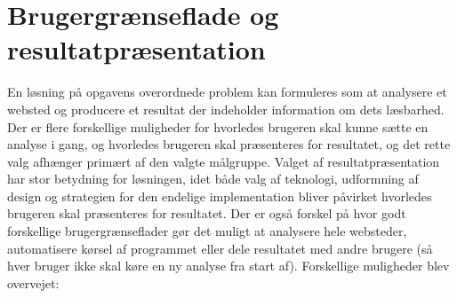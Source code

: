 \documentclass[a4paper,oneside]{memoir}
\begin{document}
\section{Brugergrænseflade og resultatpræsentation}
\label{brugergraenseflade}
En løsning på opgavens overordnede problem kan formuleres som at
analysere et websted og producere et resultat der indeholder
information om dets læsbarhed. Der er flere forskellige muligheder for
hvorledes brugeren skal kunne sætte en analyse i gang, og hvorledes
brugeren skal præsenteres for resultatet, og det rette valg afhænger
primært af den valgte målgruppe. Valget af resultatpræsentation har
stor betydning for løsningen, idet både valg af teknologi, udformning
af design og strategien for den endelige implementation bliver
påvirket hvorledes brugeren skal præsenteres for resultatet. Der er
også forskel på hvor godt forskellige brugergrænseflader gør det
muligt at analysere hele websteder, automatisere kørsel af programmet
eller dele resultatet med andre brugere (så hver bruger ikke skal køre
en ny analyse fra start af). Forskellige muligheder blev overvejet:
\end{document}
